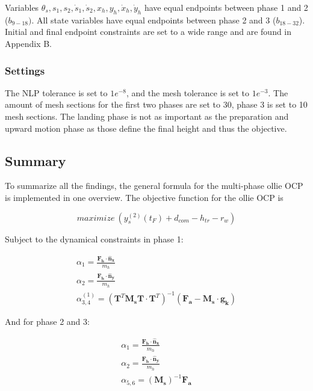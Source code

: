 \documentclass[default,iicol]{sn-jnl}
\theoremstyle{thmstyleone}%
\theoremstyle{thmstyletwo}%
\theoremstyle{thmstylethree}%
\begin{document}
Variables $\theta_s, s_1, s_2, \dot s_1, \dot s_2, x_h, y_h, \dot x_h, \dot y_h$ have equal endpoints between phase 1 and 2 ($b_{9-18})$. All state variables have equal endpoints between phase 2 and 3 ($b_{18-32}$). Initial and final endpoint constraints are set to a wide range and are found in Appendix B.

\subsubsection{Settings}\label{s_settings}
The NLP tolerance is set to $1e^{-8}$, and the mesh tolerance is set to $1e^{-3}$. The amount of mesh sections for the first two phases are set to 30, phase 3 is set to 10 mesh sections. The landing phase is not as important as the preparation and upward motion phase as those define the final height and thus the objective.

\subsection{Summary}\label{s_summary}
To summarize all the findings, the general formula for the multi-phase ollie OCP is implemented in one overview. The objective function for the ollie OCP is 

\begin{equation}
     maximize\ (y_s^{(2)}(t_F) + d_{com} - h_{tr} - r_w)
\end{equation} 

Subject to the dynamical constraints in phase 1:

\begin{equation}
\begin{array}{c}
        \alpha_{1} = \frac{\mathbf{F_h}\cdot \mathbf{\hat n_x}}{m_h}\\
        \alpha_{2} = \frac{\mathbf{F_h}\cdot \mathbf{\hat n_y}}{m_h}\\
        \alpha_{3,4}^{(1)} =   \left(\mathbf{T}^T \mathbf{M_s} \mathbf{T} \cdot  \mathbf{T}^T\right)^{-1} (\mathbf{F_a} - \mathbf{M_s} \cdot \mathbf{g_k})
\end{array}
\end{equation}

And for phase 2 and 3:

\begin{equation}
    \begin{array}{c}
        \alpha_{1} = \frac{\mathbf{F_h}\cdot \mathbf{\hat n_x}}{m_h}\\
        \alpha_{2} = \frac{\mathbf{F_h}\cdot \mathbf{\hat n_y}}{m_h}\\ 
        \alpha_{5,6} = (\mathbf{M_s})^{-1}\mathbf{F_a}
    \end{array}
\end{equation}
\end{document}
